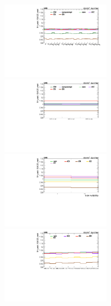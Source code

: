 \begin{figure}
  \begin{subfigure}{\linewidth}
    \centering
      \includegraphics[width=0.5\textwidth]{figures/thirteen-TeV/postfit/ratio_2l_cH}%
      \includegraphics[width=0.5\textwidth]{figures/thirteen-TeV/postfit/ratio_2l-cr_cH}
      \includegraphics[width=0.5\textwidth]{figures/thirteen-TeV/postfit/ratio_4l_cH}%
      \includegraphics[width=0.5\textwidth]{figures/thirteen-TeV/postfit/ratio_3l_cH}
    \caption{}
    \label{sfig:ratio-cH}
  \end{subfigure}
  \begin{subfigure}{\linewidth}
    \centering

\end{subfigure}
\end{figure}
